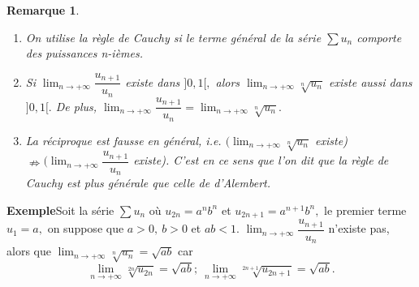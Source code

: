 \documentclass[11pt, a4paper]{book}
\newtheorem{rem}{Remarque}[section]
\begin{document}
\begin{rem} \label{rem2.1.1.2} \begin{enumerate}
\item[a-] On utilise la r\`egle de Cauchy si le terme g\'en\'eral de la s\'erie $\sum u_n$ comporte des puissances n-i\`emes.
\item[b-] Si ${\displaystyle \lim_{n\rightarrow+\infty} \dfrac{u_{n+1}}{u_n}}$ existe dans $]0,1[,$ alors ${\displaystyle \lim_{n\rightarrow+\infty}\sqrt[n]{u_n}}$ existe aussi dans $]0,1[.$ De plus, ${\displaystyle \lim_{n\rightarrow+\infty}\dfrac{u_{n+1}}{u_n}=\lim_{n\rightarrow+\infty}\sqrt[n]{u_n}.}$
\item[c-] La r\'eciproque est fausse en g\'en\'eral, i.e. $({\displaystyle  \lim_{n\rightarrow+\infty}\sqrt[n]{u_n}}$ existe)$\nRightarrow ({\displaystyle \lim_{n\rightarrow+\infty}\dfrac{u_{n+1}}{u_n}}$ existe). C'est en ce sens que l'on dit que la r\`egle de Cauchy est plus g\'en\'erale que celle de d'Alembert.
\end{enumerate} \end{rem}
\textbf{Exemple}\quad Soit la s\'erie $\sum u_n$ o\`u $u_{2n}=a^n b^n$ et $u_{2n+1}=a^{n+1}b^n,$ le premier terme $u_1=a,$ on suppose que $a>0,~b>0$ et $ab<1$. ${\displaystyle \lim_{n\rightarrow+\infty}\dfrac{u_{n+1}}{u_n}}$ n'existe pas, alors que ${\displaystyle \lim_{n\rightarrow+\infty}\sqrt[n]{u_n}=\sqrt{ab}}$ car $$\lim_{n\rightarrow+\infty}\sqrt[2n]{u_{2n}}=\sqrt{ab}; ~ \lim_{n\rightarrow+\infty}\sqrt[2n+1]{u_{2n+1}}=\sqrt{ab}.$$
\end{document}
